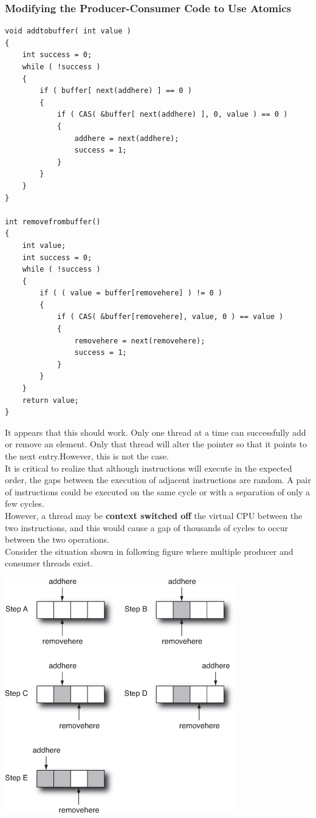 \documentclass[12pt,a4paper]{report}
\begin{document}
\subsubsection*{Modifying the Producer-Consumer Code to Use Atomics}
\begin{lstlisting}
void addtobuffer( int value )
{
	int success = 0;
	while ( !success )
	{
		if ( buffer[ next(addhere) ] == 0 )
		{
			if ( CAS( &buffer[ next(addhere) ], 0, value ) == 0 )
			{
				addhere = next(addhere);
				success = 1;
			}
		}
	}
}

int removefrombuffer()
{
	int value;
	int success = 0;
	while ( !success )
	{
		if ( ( value = buffer[removehere] ) != 0 )
		{
			if ( CAS( &buffer[removehere], value, 0 ) == value )
			{
				removehere = next(removehere);
				success = 1;
			}
		}
	}
	return value;
}

\end{lstlisting}
It appears that this should work. Only one thread at a time can successfully add or remove an element. Only that thread will alter the pointer so that it points to the next entry.However, this is not the case.
\\
It is critical to realize that although instructions will execute in the expected order, the gaps between the execution of adjacent instructions are random. A pair of instructions could be executed on the same cycle or with a separation of only a few cycles.
\\
However, a thread may be \textbf{context switched off} the virtual CPU between the two instructions, and this would cause a gap of thousands of cycles to occur between the two operations.
\\
Consider the situation shown in following figure where multiple producer and consumer threads exist.
\begin{center}
	\includegraphics{multicore_getfile.jpg}
\end{center}
\end{document}
